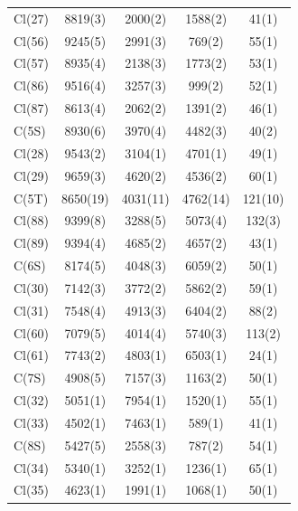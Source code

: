 \begin{center}
{\begin{supertabular}{lcccc}
Cl(27)&8819(3)&2000(2)&1588(2)&41(1)\\
Cl(56)&9245(5)&2991(3)&769(2)&55(1)\\
Cl(57)&8935(4)&2138(3)&1773(2)&53(1)\\
Cl(86)&9516(4)&3257(3)&999(2)&52(1)\\
Cl(87)&8613(4)&2062(2)&1391(2)&46(1)\\
C(5S)&8930(6)&3970(4)&4482(3)&40(2)\\
Cl(28)&9543(2)&3104(1)&4701(1)&49(1)\\
Cl(29)&9659(3)&4620(2)&4536(2)&60(1)\\
C(5T)&8650(19)&4031(11)&4762(14)&121(10)\\
Cl(88)&9399(8)&3288(5)&5073(4)&132(3)\\
Cl(89)&9394(4)&4685(2)&4657(2)&43(1)\\
C(6S)&8174(5)&4048(3)&6059(2)&50(1)\\
Cl(30)&7142(3)&3772(2)&5862(2)&59(1)\\
Cl(31)&7548(4)&4913(3)&6404(2)&88(2)\\
Cl(60)&7079(5)&4014(4)&5740(3)&113(2)\\
Cl(61)&7743(2)&4803(1)&6503(1)&24(1)\\
C(7S)&4908(5)&7157(3)&1163(2)&50(1)\\
Cl(32)&5051(1)&7954(1)&1520(1)&55(1)\\
Cl(33)&4502(1)&7463(1)&589(1)&41(1)\\
C(8S)&5427(5)&2558(3)&787(2)&54(1)\\
Cl(34)&5340(1)&3252(1)&1236(1)&65(1)\\
Cl(35)&4623(1)&1991(1)&1068(1)&50(1)\\
\end{supertabular}
}
\end{center}

